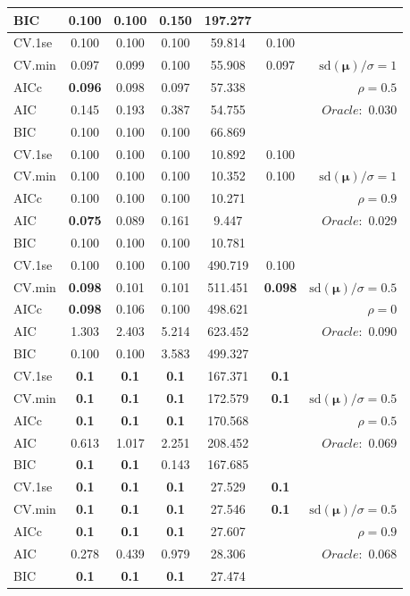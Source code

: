 \begin{table}
\begin{center}
\begin{tabular}{l*{5}{c}|r}
BIC & 0.100 & 0.100 & 0.150 & 197.277 & &  \\
 \hline 
CV.1se & 0.100 & 0.100 & 0.100 & 59.814 & 0.100 & \\
CV.min & 0.097 & 0.099 & 0.100 & 55.908 & 0.097 &  $\mathrm{sd}(\mathbf{\mu})/\sigma=1$ \\
AICc & {\bf 0.096} & 0.098 & 0.097 & 57.338 & & $\rho=0.5$ \\
AIC & 0.145 & 0.193 & 0.387 & 54.755 & &  \multirow{2}{*}{$Oracle: $ 0.030} \\
BIC & 0.100 & 0.100 & 0.100 & 66.869 & &  \\
 \hline 
CV.1se & 0.100 & 0.100 & 0.100 & 10.892 & 0.100 & \\
CV.min & 0.100 & 0.100 & 0.100 & 10.352 & 0.100 &  $\mathrm{sd}(\mathbf{\mu})/\sigma=1$ \\
AICc & 0.100 & 0.100 & 0.100 & 10.271 & & $\rho=0.9$ \\
AIC & {\bf 0.075} & 0.089 & 0.161 & 9.447 & &  \multirow{2}{*}{$Oracle: $ 0.029} \\
BIC & 0.100 & 0.100 & 0.100 & 10.781 & &  \\
 \hline 
CV.1se & 0.100 & 0.100 & 0.100 & 490.719 & 0.100 & \\
CV.min & {\bf 0.098} & 0.101 & 0.101 & 511.451 & {\bf 0.098} &  $\mathrm{sd}(\mathbf{\mu})/\sigma=0.5$ \\
AICc & {\bf 0.098} & 0.106 & 0.100 & 498.621 & & $\rho=0$ \\
AIC & 1.303 & 2.403 & 5.214 & 623.452 & &  \multirow{2}{*}{$Oracle: $ 0.090} \\
BIC & 0.100 & 0.100 & 3.583 & 499.327 & &  \\
 \hline 
CV.1se & {\bf 0.1} & {\bf 0.1} & {\bf 0.1} & 167.371 & {\bf 0.1} & \\
CV.min & {\bf 0.1} & {\bf 0.1} & {\bf 0.1} & 172.579 & {\bf 0.1} &  $\mathrm{sd}(\mathbf{\mu})/\sigma=0.5$ \\
AICc & {\bf 0.1} & {\bf 0.1} & {\bf 0.1} & 170.568 & & $\rho=0.5$ \\
AIC & 0.613 & 1.017 & 2.251 & 208.452 & &  \multirow{2}{*}{$Oracle: $ 0.069} \\
BIC & {\bf 0.1} & {\bf 0.1} & 0.143 & 167.685 & &  \\
 \hline 
CV.1se & {\bf 0.1} & {\bf 0.1} & {\bf 0.1} & 27.529 & {\bf 0.1} & \\
CV.min & {\bf 0.1} & {\bf 0.1} & {\bf 0.1} & 27.546 & {\bf 0.1} &  $\mathrm{sd}(\mathbf{\mu})/\sigma=0.5$ \\
AICc & {\bf 0.1} & {\bf 0.1} & {\bf 0.1} & 27.607 & & $\rho=0.9$ \\
AIC & 0.278 & 0.439 & 0.979 & 28.306 & &  \multirow{2}{*}{$Oracle: $ 0.068} \\
BIC & {\bf 0.1} & {\bf 0.1} & {\bf 0.1} & 27.474 & &  \\
 \hline 
\end{tabular}
\end{center}
\vspace{-1cm}
\end{table}




